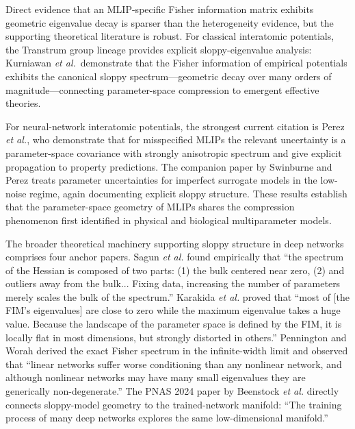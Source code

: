 Direct evidence that an MLIP-specific Fisher information matrix exhibits geometric eigenvalue decay is sparser than the heterogeneity evidence, but the supporting theoretical literature is robust. For classical interatomic potentials, the Transtrum group lineage provides explicit sloppy-eigenvalue analysis: Kurniawan \emph{et al.}\ demonstrate that the Fisher information of empirical potentials exhibits the canonical sloppy spectrum---geometric decay over many orders of magnitude---connecting parameter-space compression to emergent effective theories\cite{machta2013parameter, quinn2023information}.

For neural-network interatomic potentials, the strongest current citation is Perez \emph{et al.}\cite{perez2025misspecified}, who demonstrate that for misspecified MLIPs the relevant uncertainty is a parameter-space covariance with strongly anisotropic spectrum and give explicit propagation to property predictions. The companion paper by Swinburne and Perez\cite{swinburne2025parameter} treats parameter uncertainties for imperfect surrogate models in the low-noise regime, again documenting explicit sloppy structure. These results establish that the parameter-space geometry of MLIPs shares the compression phenomenon first identified in physical and biological multiparameter models.

The broader theoretical machinery supporting sloppy structure in deep networks comprises four anchor papers. Sagun \emph{et al.}\cite{sagun2017empirical} found empirically that ``the spectrum of the Hessian is composed of two parts: (1) the bulk centered near zero, (2) and outliers away from the bulk... Fixing data, increasing the number of parameters merely scales the bulk of the spectrum.'' Karakida \emph{et al.}\cite{karakida2019universal} proved that ``most of [the FIM's eigenvalues] are close to zero while the maximum eigenvalue takes a huge value. Because the landscape of the parameter space is defined by the FIM, it is locally flat in most dimensions, but strongly distorted in others.'' Pennington and Worah\cite{pennington2018spectrum} derived the exact Fisher spectrum in the infinite-width limit and observed that ``linear networks suffer worse conditioning than any nonlinear network, and although nonlinear networks may have many small eigenvalues they are generically non-degenerate.'' The PNAS 2024 paper by Beenstock \emph{et al.}\cite{beenstock2024training} directly connects sloppy-model geometry to the trained-network manifold: ``The training process of many deep networks explores the same low-dimensional manifold.''

